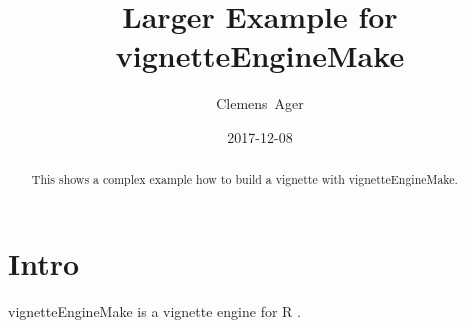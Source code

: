 \documentclass[twocolumn]{article}
\title{Larger Example for vignetteEngineMake}
\author{Clemens~Ager}
\date{2017-12-08}
\begin{document}
\maketitle

\begin{abstract}
  This shows a complex example how to build a vignette with vignetteEngineMake.
\end{abstract}


\setcounter{tocdepth}{2}
\tableofcontents

\section{Intro}

vignetteEngineMake is a vignette engine for R \cite{rman}.



\appendix 

\printbibliography{}
\end{document}
